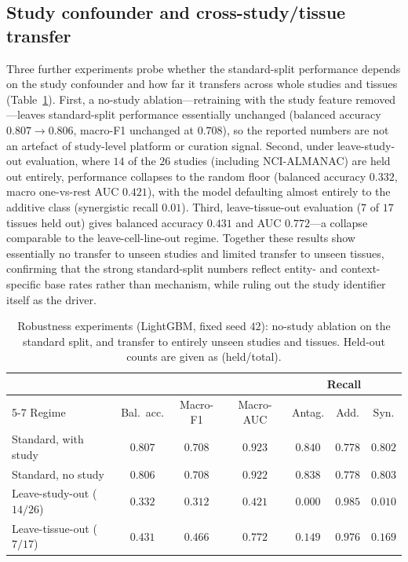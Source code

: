 \documentclass[11pt]{article}
\begin{document}
\subsection{Study confounder and cross-study/tissue transfer}
Three further experiments probe whether the standard-split performance depends on the study confounder
and how far it transfers across whole studies and tissues (Table~\ref{tab:robust}). First, a no-study
ablation---retraining with the study feature removed---leaves standard-split performance essentially
unchanged (balanced accuracy $0.807\rightarrow0.806$, macro-F1 unchanged at $0.708$), so the reported
numbers are not an artefact of study-level platform or curation signal. Second, under leave-study-out
evaluation, where $14$ of the $26$ studies (including NCI-ALMANAC) are held out entirely, performance
collapses to the random floor (balanced accuracy $0.332$, macro one-vs-rest AUC $0.421$), with the
model defaulting almost entirely to the additive class (synergistic recall $0.01$). Third,
leave-tissue-out evaluation ($7$ of $17$ tissues held out) gives balanced accuracy $0.431$ and AUC
$0.772$---a collapse comparable to the leave-cell-line-out regime. Together these results show
essentially no transfer to unseen studies and limited transfer to unseen tissues, confirming that the
strong standard-split numbers reflect entity- and context-specific base rates rather than mechanism,
while ruling out the study identifier itself as the driver.

\begin{table}[H]
\centering
\caption{Robustness experiments (LightGBM, fixed seed $42$): no-study ablation on the standard split,
and transfer to entirely unseen studies and tissues. Held-out counts are given as (held/total).}
\label{tab:robust}
\small
\begin{tabular}{lcccccc}
\toprule
 & & & & \multicolumn{3}{c}{Recall} \\
\cmidrule(lr){5-7}
Regime & Bal.\ acc. & Macro-F1 & Macro-AUC & Antag. & Add. & Syn. \\
\midrule
Standard, with study      & $0.807$ & $0.708$ & $0.923$ & $0.840$ & $0.778$ & $0.802$ \\
Standard, no study        & $0.806$ & $0.708$ & $0.922$ & $0.838$ & $0.778$ & $0.803$ \\
Leave-study-out ($14/26$) & $0.332$ & $0.312$ & $0.421$ & $0.000$ & $0.985$ & $0.010$ \\
Leave-tissue-out ($7/17$) & $0.431$ & $0.466$ & $0.772$ & $0.149$ & $0.976$ & $0.169$ \\
\bottomrule
\end{tabular}
\end{table}
\end{document}
